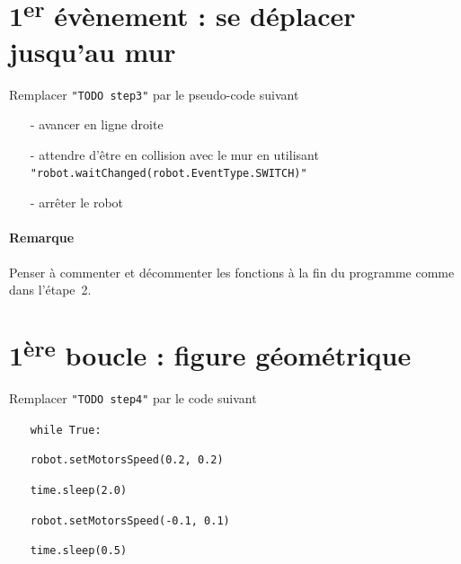 \documentclass{report}
\begin{document}
\section{1\textsuperscript{er} évènement : se déplacer jusqu'au mur}

\begin{itemize}
\step Remplacer \texttt{"TODO step3"} par le pseudo-code suivant
\begin{itemize}
    \item[-] avancer en ligne droite
    \item[-] attendre d'être en collision avec le mur en utilisant \texttt{"robot.waitChanged(robot.EventType.SWITCH)"}
    \item[-] arrêter le robot
\end{itemize}
\end{itemize}

\paragraph{Remarque}
Penser à commenter et décommenter les fonctions à la fin du programme comme dans l'étape~2.

\section{1\textsuperscript{ère} boucle : figure géométrique}

\begin{itemize}
\step Remplacer \texttt{"TODO step4"} par le code suivant
    \begin{itemize}
        \item[] \texttt{while True:}
        \item[] \hspace{5mm} \texttt{robot.setMotorsSpeed(0.2, 0.2)}
        \item[] \hspace{5mm} \texttt{time.sleep(2.0)}
        \item[] \hspace{5mm} \texttt{robot.setMotorsSpeed(-0.1, 0.1)}
        \item[] \hspace{5mm} \texttt{time.sleep(0.5)}
    \end{itemize}
\end{itemize}
\end{document}
